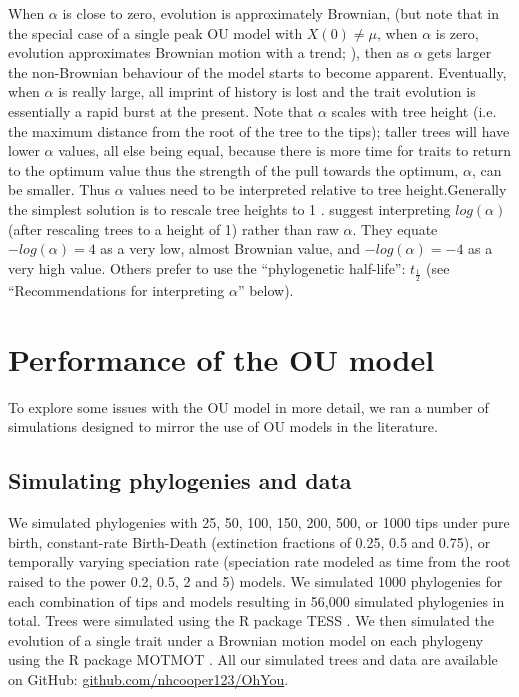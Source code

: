 \documentclass[a4paper,12pt]{article}
\begin{document}
    When $\alpha$ is close to zero, evolution is approximately Brownian, (but note that in the special case of a single peak OU model with $X(0) \neq \mu$, when $\alpha$ is zero, evolution approximates Brownian motion with a trend; \citealp{hansen1997stabilizing,benson2014competition}), then as $\alpha$ gets larger the non-Brownian behaviour of the model starts to become apparent. 
    Eventually, when $\alpha$ is really large, all imprint of history is lost and the trait evolution is essentially a rapid burst at the present.
    Note that $\alpha$ scales with tree height (i.e. the maximum distance from the root of the tree to the tips); taller trees will have lower $\alpha$ values, all else being equal, because there is more time for traits to return to the optimum value thus the strength of the pull towards the optimum, $\alpha$, can be smaller.
    Thus $\alpha$ values need to be interpreted relative to tree height.Generally the simplest solution is to rescale tree heights to 1 \citep[e.g.,][simulations below]{ives2010phylogenetic}. 
    \citet{ives2010phylogenetic} suggest interpreting $log( \alpha)$ (after rescaling trees to a height of 1) rather than raw $\alpha$. They equate $-log( \alpha) = 4$ as a very low, almost Brownian value, and $-log( \alpha) = -4$ as a very high value. 
    Others \citep[e.g.][]{slater2015iterative,slater2013robust,hansen2012interpreting} prefer to use the ``phylogenetic half-life'': $t_\frac{1}{2}$ (see ``Recommendations for interpreting $\alpha$'' below).  
  
\section{Performance of the OU model}

  To explore some issues with the OU model in more detail, we ran a number of simulations designed to mirror the use of OU models in the literature.

  \subsection{Simulating phylogenies and data}
    We simulated phylogenies with 25, 50, 100, 150, 200, 500, or 1000 tips under pure birth, constant-rate Birth-Death (extinction fractions of 0.25, 0.5 and 0.75), or temporally varying speciation rate (speciation rate modeled as time from the root raised to the power 0.2, 0.5, 2 and 5) models. 
    We simulated 1000 phylogenies for each combination of tips and models resulting in 56,000 simulated phylogenies in total. 
    Trees were simulated using the R package TESS \citep{hohna2013fast}. 
    We then simulated the evolution of a single trait under a Brownian motion model on each phylogeny using the R package MOTMOT \citep{Thomas:2011aa}. 
    All our simulated trees and data are available on GitHub: \href{https://github.com/nhcooper123/OhYou}{github.com/nhcooper123/OhYou}.
\end{document}

